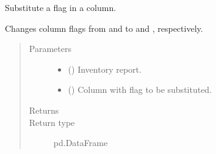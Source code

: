 \documentclass[letterpaper,10pt,english]{sphinxmanual}
\begin{document}
\begin{fulllineitems}
\label{\detokenize{source/optimization.datatools:optimization.datatools.dataprep.substitute_flag}}
Substitute a flag in a column.

Changes column flags from  and  to  and , respectively.
\begin{quote}\begin{description}
\item[{Parameters}] \leavevmode\begin{itemize}
\item {} 
 () \textendash{} Inventory report.

\item {} 
 () \textendash{} Column with flag to be substituted.

\end{itemize}

\item[{Returns}] \leavevmode
{}

\item[{Return type}] \leavevmode
pd.DataFrame

\end{description}\end{quote}

\end{fulllineitems}

\end{document}
